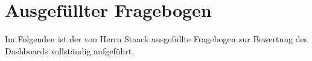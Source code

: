 \appendix


%	
%	
%	


%	
%	

\chapter{Ausgefüllter Fragebogen}
\label{app:fragebogen}

Im Folgenden ist der von Herrn Staack ausgefüllte Fragebogen zur Bewertung des Dashboards vollständig aufgeführt.



\clearpage